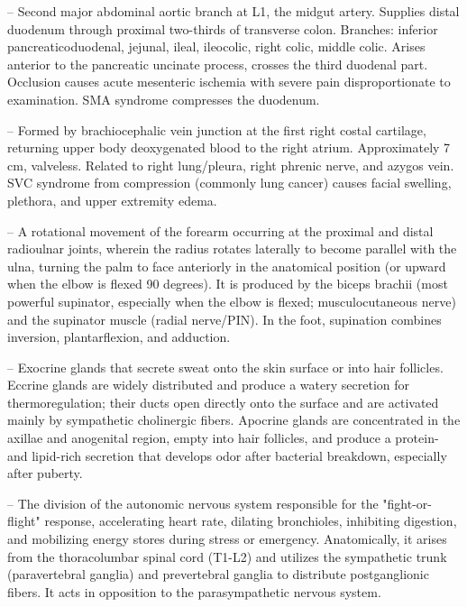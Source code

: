 -- Second major abdominal aortic branch at L1, the midgut artery. Supplies distal duodenum through proximal two-thirds of transverse colon. Branches: inferior pancreaticoduodenal, jejunal, ileal, ileocolic, right colic, middle colic. Arises anterior to the pancreatic uncinate process, crosses the third duodenal part. Occlusion causes acute mesenteric ischemia with severe pain disproportionate to examination. SMA syndrome compresses the duodenum.

-- Formed by brachiocephalic vein junction at the first right costal cartilage, returning upper body deoxygenated blood to the right atrium. Approximately 7 cm, valveless. Related to right lung/pleura, right phrenic nerve, and azygos vein. SVC syndrome from compression (commonly lung cancer) causes facial swelling, plethora, and upper extremity edema.

-- A rotational movement of the forearm occurring at the proximal and distal radioulnar joints, wherein the radius rotates laterally to become parallel with the ulna, turning the palm to face anteriorly in the anatomical position (or upward when the elbow is flexed 90 degrees). It is produced by the biceps brachii (most powerful supinator, especially when the elbow is flexed; musculocutaneous nerve) and the supinator muscle (radial nerve/PIN). In the foot, supination combines inversion, plantarflexion, and adduction.

-- Exocrine glands that secrete sweat onto the skin surface or into hair follicles. Eccrine glands are widely distributed and produce a watery secretion for thermoregulation; their ducts open directly onto the surface and are activated mainly by sympathetic cholinergic fibers. Apocrine glands are concentrated in the axillae and anogenital region, empty into hair follicles, and produce a protein- and lipid-rich secretion that develops odor after bacterial breakdown, especially after puberty.

-- The division of the autonomic nervous system responsible for the "fight-or-flight" response, accelerating heart rate, dilating bronchioles, inhibiting digestion, and mobilizing energy stores during stress or emergency. Anatomically, it arises from the thoracolumbar spinal cord (T1-L2) and utilizes the sympathetic trunk (paravertebral ganglia) and prevertebral ganglia to distribute postganglionic fibers. It acts in opposition to the parasympathetic nervous system.

